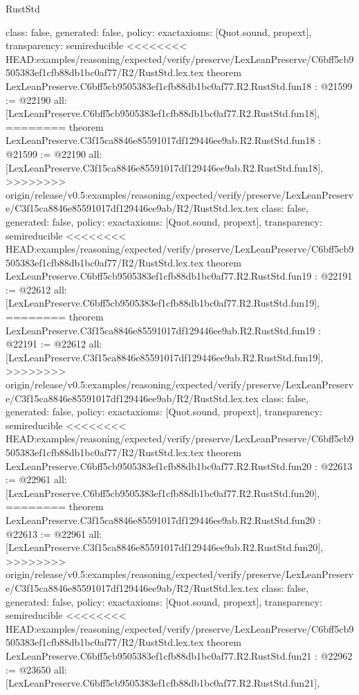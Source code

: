 \begin{lexlean}{RustStd}
\begin{coremodule}
{\begin{coremodule}
{{{{{{{{{{{{{{{{{{{{{  class: false,
  generated: false,
  policy: exact{axioms: [Quot.sound, propext]},
  transparency: semireducible
}
<<<<<<<< HEAD:examples/reasoning/expected/verify/preserve/LexLeanPreserve/C6bff5cb9505383ef1cfb88db1bc0af77/R2/RustStd.lex.tex
theorem LexLeanPreserve.C6bff5cb9505383ef1cfb88db1bc0af77.R2.RustStd.fun18 : @21599 := @22190 {
  all: [LexLeanPreserve.C6bff5cb9505383ef1cfb88db1bc0af77.R2.RustStd.fun18],
========
theorem LexLeanPreserve.C3f15ca8846e85591017df129446ee9ab.R2.RustStd.fun18 : @21599 := @22190 {
  all: [LexLeanPreserve.C3f15ca8846e85591017df129446ee9ab.R2.RustStd.fun18],
>>>>>>>> origin/release/v0.5:examples/reasoning/expected/verify/preserve/LexLeanPreserve/C3f15ca8846e85591017df129446ee9ab/R2/RustStd.lex.tex
  class: false,
  generated: false,
  policy: exact{axioms: [Quot.sound, propext]},
  transparency: semireducible
}
<<<<<<<< HEAD:examples/reasoning/expected/verify/preserve/LexLeanPreserve/C6bff5cb9505383ef1cfb88db1bc0af77/R2/RustStd.lex.tex
theorem LexLeanPreserve.C6bff5cb9505383ef1cfb88db1bc0af77.R2.RustStd.fun19 : @22191 := @22612 {
  all: [LexLeanPreserve.C6bff5cb9505383ef1cfb88db1bc0af77.R2.RustStd.fun19],
========
theorem LexLeanPreserve.C3f15ca8846e85591017df129446ee9ab.R2.RustStd.fun19 : @22191 := @22612 {
  all: [LexLeanPreserve.C3f15ca8846e85591017df129446ee9ab.R2.RustStd.fun19],
>>>>>>>> origin/release/v0.5:examples/reasoning/expected/verify/preserve/LexLeanPreserve/C3f15ca8846e85591017df129446ee9ab/R2/RustStd.lex.tex
  class: false,
  generated: false,
  policy: exact{axioms: [Quot.sound, propext]},
  transparency: semireducible
}
<<<<<<<< HEAD:examples/reasoning/expected/verify/preserve/LexLeanPreserve/C6bff5cb9505383ef1cfb88db1bc0af77/R2/RustStd.lex.tex
theorem LexLeanPreserve.C6bff5cb9505383ef1cfb88db1bc0af77.R2.RustStd.fun20 : @22613 := @22961 {
  all: [LexLeanPreserve.C6bff5cb9505383ef1cfb88db1bc0af77.R2.RustStd.fun20],
========
theorem LexLeanPreserve.C3f15ca8846e85591017df129446ee9ab.R2.RustStd.fun20 : @22613 := @22961 {
  all: [LexLeanPreserve.C3f15ca8846e85591017df129446ee9ab.R2.RustStd.fun20],
>>>>>>>> origin/release/v0.5:examples/reasoning/expected/verify/preserve/LexLeanPreserve/C3f15ca8846e85591017df129446ee9ab/R2/RustStd.lex.tex
  class: false,
  generated: false,
  policy: exact{axioms: [Quot.sound, propext]},
  transparency: semireducible
}
<<<<<<<< HEAD:examples/reasoning/expected/verify/preserve/LexLeanPreserve/C6bff5cb9505383ef1cfb88db1bc0af77/R2/RustStd.lex.tex
theorem LexLeanPreserve.C6bff5cb9505383ef1cfb88db1bc0af77.R2.RustStd.fun21 : @22962 := @23650 {
  all: [LexLeanPreserve.C6bff5cb9505383ef1cfb88db1bc0af77.R2.RustStd.fun21],
}}}}}}}}}}}}}}}}}}}}}}}}
\end{coremodule}}
\end{coremodule}
\end{lexlean}
